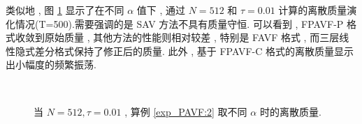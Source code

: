 	类似地 , 图 \ref{fig_PAVF:4} 显示了在不同 $\alpha$ 值下 , 通过 $N=512$ 和 $\tau=0.01$ 计算的离散质量演化情况(T=500).需要强调的是 SAV 方法不具有质量守恒.
可以看到 , FPAVF-P 格式收敛到原始质量 , 其他方法的性能则相对较差 , 特别是 FAVF 格式 , 而三层线性隐式差分格式保持了修正后的质量.
此外 , 基于 FPAVF-C 格式的离散质量显示出小幅度的频繁振荡.


\begin{figure}[H]
	\begin{center}
	 \\
	\caption{当 $N = 512 , \tau=0.01$ , 算例 \ref{exp_PAVF:2} 取不同 $\alpha$ 时的离散质量.}
	 \label{fig_PAVF:4}
	\end{center}
	\end{figure}
